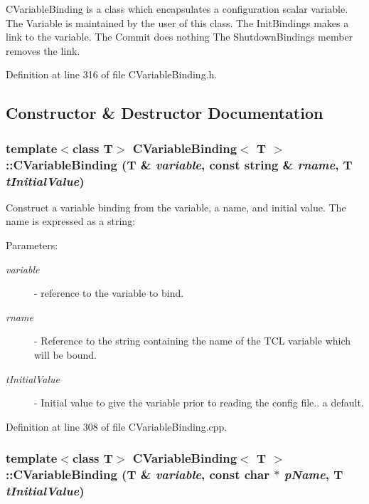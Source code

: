 CVariable\-Binding is a class which encapsulates a configuration scalar variable. The Variable is maintained by the user of this class. The Init\-Bindings makes a link to the variable. The Commit does nothing The Shutdown\-Bindings member removes the link. 



Definition at line 316 of file CVariable\-Binding.h.

\subsection{Constructor \& Destructor Documentation}
\subsubsection{\setlength{\rightskip}{0pt plus 5cm}template$<$class T$>$ CVariable\-Binding$<$ T $>$::CVariable\-Binding (T \& {\em variable}, const string \& {\em rname}, T {\em t\-Initial\-Value})}\label{classCVariableBinding_a0}


Construct a variable binding from the variable, a name, and initial value. The name is expressed as a string:\begin{Desc}
\item[Parameters: ]\par
\begin{description}
\item[{\em 
variable}]- reference to the variable to bind. \item[{\em 
rname}]- Reference to the string containing the name of the TCL variable which will be bound. \item[{\em 
t\-Initial\-Value}]- Initial value to give the variable prior to  reading the config file.. a default. \end{description}
\end{Desc}


Definition at line 308 of file CVariable\-Binding.cpp.
\subsubsection{\setlength{\rightskip}{0pt plus 5cm}template$<$class T$>$ CVariable\-Binding$<$ T $>$::CVariable\-Binding (T \& {\em variable}, const char $\ast$ {\em p\-Name}, T {\em t\-Initial\-Value})}\label{classCVariableBinding_a1}


